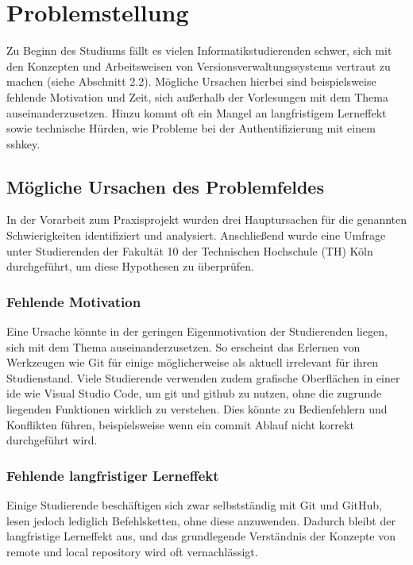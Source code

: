 \chapter{Problemstellung}
\label{chap:formal}


Zu Beginn des Studiums fällt es vielen Informatikstudierenden schwer, sich mit den Konzepten und Arbeitsweisen von Versionsverwaltungssystems vertraut zu machen (siehe Abschnitt 2.2).
Mögliche Ursachen hierbei sind beispielsweise fehlende Motivation und Zeit, sich außerhalb der Vorlesungen mit dem Thema auseinanderzusetzen.
Hinzu kommt oft ein Mangel an langfristigem Lerneffekt sowie technische Hürden, wie Probleme bei der Authentifizierung mit einem \gls{sshkey}.

\section{Mögliche Ursachen des Problemfeldes}
In der Vorarbeit zum Praxisprojekt wurden drei Hauptursachen für die genannten Schwierigkeiten identifiziert und analysiert.
Anschließend wurde eine Umfrage unter Studierenden der Fakultät 10 der Technischen Hochschule (TH) Köln durchgeführt, um diese Hypothesen zu überprüfen.

\subsection{Fehlende Motivation}
Eine Ursache könnte in der geringen Eigenmotivation der Studierenden liegen, sich mit dem Thema auseinanderzusetzen. So erscheint das Erlernen von Werkzeugen wie Git für einige möglicherweise als aktuell irrelevant für ihren Studienstand.
Viele Studierende verwenden zudem grafische Oberflächen in einer \gls{ide} wie Visual Studio Code, um \gls{git} und \gls{github} zu nutzen, ohne die zugrunde liegenden Funktionen wirklich zu verstehen. Dies könnte zu Bedienfehlern und Konflikten führen, beispielsweise wenn ein \gls{commit} Ablauf nicht korrekt durchgeführt wird.

\subsection{Fehlende langfristiger Lerneffekt}
Einige Studierende beschäftigen sich zwar selbstständig mit Git und GitHub, lesen jedoch lediglich Befehlsketten, ohne diese anzuwenden. 
Dadurch bleibt der langfristige Lerneffekt aus, und das grundlegende Verständnis der Konzepte von \gls{remote} und \gls{local} \gls{repository} wird oft vernachlässigt.


